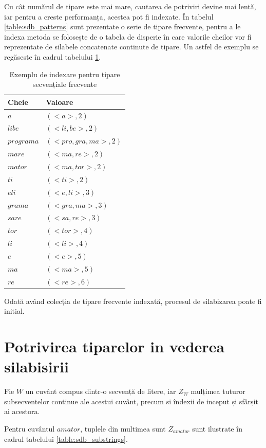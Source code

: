 Cu cât numărul de tipare este mai mare, cautarea de potriviri devine mai lentă, iar pentru a creste performanța, acestea pot fi indexate. În tabelul \ref{table:sdb_patterns} sunt prezentate o serie de tipare frecvente, pentru a le indexa metoda se folosește de o tabela de disperie în care valorile cheilor vor fi reprezentate de silabele concatenate continute de tipare. Un astfel de exemplu se regăseste în cadrul tabelului \ref{table:sdb_index}. 

\begin{table}[h!]
\centering    
\begin{tabular}{|l|l|}    
\hline      
Cheie & Valoare\\
\hline
$a$ 		& $(<a>, 2)$  \\
$libe$ 		& $(<li, be>, 2)$  \\
$programa$ 	& $(<pro, gra, ma>, 2)$  \\
$mare$ 		& $(<ma, re>, 2)$  \\
$mator$ 	& $(<ma, tor>, 2)$  \\
$ti$ 		& $(<ti>, 2)$  \\
$eli$ 		& $(<e, li>, 3)$  \\
$grama$ 	& $(<gra, ma>, 3)$  \\
$sare$ 		& $(<sa, re>, 3)$  \\
$tor$ 		& $(<tor>, 4)$  \\
$li$ 		& $(<li>, 4)$  \\
$e$ 		& $(<e>, 5)$  \\
$ma$ 		& $(<ma>, 5)$  \\
$re$ 		& $(<re>, 6)$  \\
\hline
\end{tabular}
\caption{Exemplu de indexare pentru tipare secvențiale frecvente}
\label{table:sdb_index}               
\end{table}  

Odată având colecția de tipare frecvente indexată, procesul de silabizarea poate fi initial. 
 
\section{Potrivirea tiparelor in vederea silabisirii}

Fie $W$ un cuvânt compus dintr-o secvență de litere, iar $Z_W$ mulțimea tuturor subsecventelor continue ale acestui cuvânt, precum si îndexii de inceput și sfârșit ai acestora.

\begin{ex}
Pentru cuvântul $amator$, tuplele din multimea sunt $Z_{amator}$ sunt ilustrate în cadrul tabelului \ref{table:sdb_substrings}. 
\end{ex}


